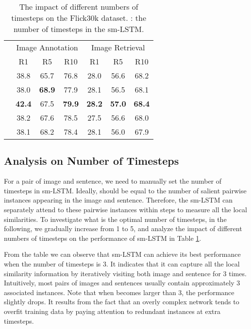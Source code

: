\documentclass[10pt,twocolumn,letterpaper]{article}
\begin{document}
\begin{table}[t] \small
\centering
\caption{The impact of different numbers of timesteps on the Flick30k dataset. : the number of timesteps in the sm-LSTM.}
\begin{tabular}{l|ccc|ccc}
\hline
\hline
\multirow{2}{0.7cm}{}     &  \multicolumn{3}{c|}{Image Annotation}  &  \multicolumn{3}{c}{Image Retrieval}   \\
\cline{2-7}
     & R1 & R5  & R10   & R1 & R5  & R10     \\
\hline
\hspace{0mm}       &38.8 &65.7 &76.8 &28.0 &56.6 &68.2 \\
\hspace{0mm}       &38.0 &\bf{68.9} &77.9 &28.1 &56.5 &68.1 \\
\hspace{0mm}       &\bf{42.4} &67.5 &\bf{79.9} &\bf{28.2} &\bf{57.0} &\bf{68.4} \\
\hspace{0mm}       &38.2 &67.6 &78.5 &27.5 &56.6 &68.0  \\
\hspace{0mm}       &38.1 &68.2 &78.4 &28.1 &56.0 &67.9  \\

\hline
\hline
\end{tabular}
\label{table:step}
\end{table}











\subsection{Analysis on Number of Timesteps} \label{sec:temporal-step}
For a pair of image and sentence, we need to manually set the number of timesteps  in sm-LSTM.
Ideally,  should be equal to the number of salient pairwise instances appearing in the image and sentence.
Therefore, the sm-LSTM can separately attend to these pairwise instances
within  steps to measure all the local similarities.
To investigate what is the optimal number of timesteps,
in the following, we gradually increase  from 1 to 5, and
analyze the impact of different numbers of timesteps on the performance of sm-LSTM
in Table \ref{table:step}.

From the table we can observe that sm-LSTM
can achieve its best performance when the
number of timesteps is 3. It indicates that it can
capture all the local similarity information by iteratively visiting both image and sentence for 3 times.
Intuitively, most pairs of images and sentences usually contain approximately 3 associated instances.
Note that when  becomes larger than 3, the performance slightly drops.
It results from the fact that an overly complex network tends to overfit training data
by paying attention to redundant instances at extra timesteps.
\end{document}
